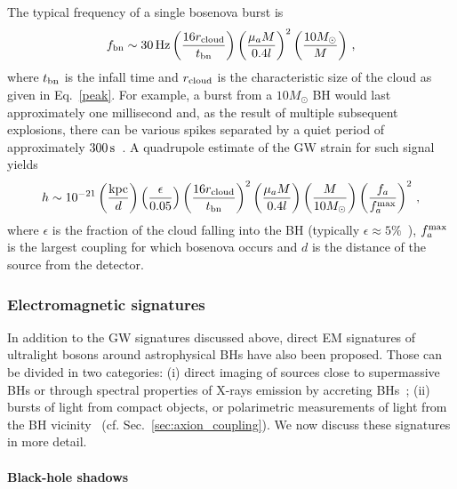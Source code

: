 \documentclass[11pt]{article}
\numberwithin{equation}{section} %
\begin{document}
The typical frequency of a single bosenova burst is~\cite{Yoshino:2012kn,Kodama:2011zc,Arvanitaki:2014wva}
\begin{equation}
 f_{\rm bn}\sim 30\,{\rm Hz}\left(\frac{16 r_{\rm cloud}}{t_{\rm bn}}\right)\left(\frac{\mu_a M}{0.4 l}\right)^2 \left(\frac{10 M_\odot}{M}\right)\,,
\end{equation}
where $t_{\rm bn}$ is the infall time and $r_{\rm cloud}$ is the characteristic size of the cloud as given in Eq.~\eqref{peak}. For example, a burst from a $10 M_\odot$ BH would last approximately one millisecond and, as the result of multiple subsequent explosions, there can be various spikes separated by a quiet period of approximately $300\, {\rm s}$~\cite{Arvanitaki:2014wva}. A quadrupole estimate of the GW strain for such signal yields~\cite{Yoshino:2012kn,Kodama:2011zc,Arvanitaki:2014wva}
\begin{equation}
 h\sim 10^{-21} \left(\frac{{\rm kpc}}{d}\right)\left(\frac{\epsilon}{0.05}\right) \left(\frac{16 r_{\rm cloud}}{t_{\rm bn}}\right)^2  \left(\frac{\mu_a M}{0.4 l}\right) \left(\frac{M}{10 M_\odot}\right)\left(\frac{f_a}{f_a^{\rm max}}\right)^2\,,
\end{equation}
where $\epsilon$ is the fraction of the cloud falling into the BH (typically $\epsilon\approx 5\%$~\cite{Yoshino:2012kn}), $f_a^{\rm max}$ is the largest coupling for which bosenova occurs and $d$ is the distance of the source from the detector.


\subsubsection{Electromagnetic signatures}
In addition to the GW signatures discussed above, direct EM signatures of ultralight bosons around astrophysical BHs have also been proposed. Those can be divided in two categories: (i) direct imaging of sources close to supermassive BHs or through spectral properties of X-rays emission by accreting BHs~\cite{Cunha:2015yba,Cunha:2016bpi,Vincent:2016sjq,Cunha:2019ikd,Franchini:2016yvq,Ni:2016rhz}; (ii) bursts of light from compact objects, or polarimetric measurements of light from the BH vicinity~\cite{Rosa:2017ury,Ikeda:2019fvj,Boskovic:2018lkj,Plascencia:2017kca,Chen:2019fsq} (cf. Sec.~\ref{sec:axion_coupling}). We now discuss these signatures in more detail.

\paragraph{Black-hole shadows} 
\end{document}
